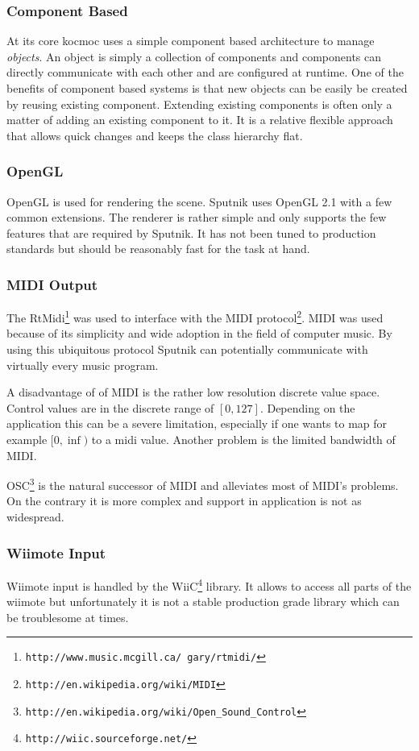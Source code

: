 \documentclass[10pt,a4paper]{scrartcl}
\begin{document}
\subsubsection{Component Based}
At its core kocmoc uses a simple component based architecture to manage \emph{objects}. An object is simply a collection of components and components can directly communicate with each other and are configured at runtime. One of the benefits of component based systems is that new objects can be easily be created by reusing existing component. Extending existing components is often only a matter of adding an existing component to it. It is a relative flexible approach that allows quick changes and keeps the class hierarchy flat.

\subsubsection{OpenGL}
OpenGL is used for rendering the scene. Sputnik uses OpenGL 2.1 with a few common extensions. The renderer is rather simple and only supports the few features that are required by Sputnik. It has not been tuned to production standards but should be reasonably fast for the task at hand.

\subsubsection{MIDI Output}
The RtMidi\footnote{\texttt{http://www.music.mcgill.ca/~gary/rtmidi/}} was used to interface with the MIDI protocol\footnote{\texttt{http://en.wikipedia.org/wiki/MIDI}}. MIDI was used because of its simplicity and wide adoption in the field of computer music. By using this ubiquitous protocol Sputnik can potentially communicate with virtually every music program. 

A disadvantage of of MIDI is the rather low resolution discrete value space. Control values are in the discrete range of $[0, 127]$. Depending on the application this can be a severe limitation, especially if one wants to map for example $[0, \inf)$ to a midi value. Another problem is the limited bandwidth of MIDI.

OSC\footnote{\texttt{http://en.wikipedia.org/wiki/Open\_Sound\_Control}} is the natural successor of MIDI and alleviates most of MIDI's problems. On the contrary it is more complex and support in application is not as widespread.

\subsubsection{Wiimote Input}
Wiimote input is handled by the WiiC\footnote{\texttt{http://wiic.sourceforge.net/}} library. It allows to access all parts of the wiimote but unfortunately it is not a stable production grade library which can be troublesome at times.
\end{document}
